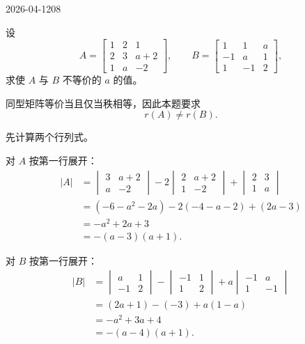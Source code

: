 \begin{mistake}{2026-04-12}{08}

\begin{problemcontent}
设
\[
A=\begin{bmatrix}
1&2&1\\
2&3&a+2\\
1&a&-2
\end{bmatrix},
\qquad
B=\begin{bmatrix}
1&1&a\\
-1&a&1\\
1&-1&2
\end{bmatrix},
\]
求使 \(A\) 与 \(B\) 不等价的 \(a\) 的值。

\end{problemcontent}

\begin{solutioncontent}
同型矩阵等价当且仅当秩相等，因此本题要求
\[
r(A)\ne r(B).
\]

先计算两个行列式。

对 \(A\) 按第一行展开：
\[
\begin{aligned}
|A|
&=\begin{vmatrix}3&a+2\\ a&-2\end{vmatrix}
-2\begin{vmatrix}2&a+2\\ 1&-2\end{vmatrix}
+\begin{vmatrix}2&3\\ 1&a\end{vmatrix}\\
&=( -6-a^2-2a)-2(-4-a-2)+(2a-3)\\
&=-a^2+2a+3\\
&=-(a-3)(a+1).
\end{aligned}
\]

对 \(B\) 按第一行展开：
\[
\begin{aligned}
|B|
&=\begin{vmatrix}a&1\\ -1&2\end{vmatrix}
-\begin{vmatrix}-1&1\\ 1&2\end{vmatrix}
+a\begin{vmatrix}-1&a\\ 1&-1\end{vmatrix}\\
&=(2a+1)-(-3)+a(1-a)\\
&=-a^2+3a+4\\
&=-(a-4)(a+1).
\end{aligned}
\]


\end{solutioncontent}
\end{mistake}
